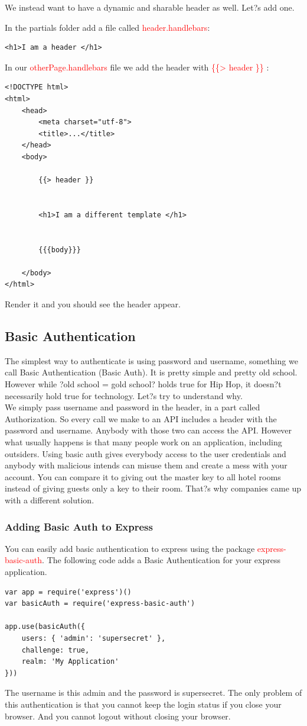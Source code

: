 \documentclass[a4paper]{article}
\begin{document}
We instead want to have a dynamic and sharable header as well. Let?s add one.

In the partials folder add a file called \textcolor{red}{header.handlebars}:
\begin{lstlisting}
<h1>I am a header </h1>
\end{lstlisting}
In our \textcolor{red}{otherPage.handlebars} file we add the header with \textcolor{red}{\{\{> header \}\}} :
\begin{lstlisting}
<!DOCTYPE html>
<html>
    <head>
        <meta charset="utf-8">
        <title>...</title>
    </head>
    <body>
        
        {{> header }}
        

        <h1>I am a different template </h1>

        
        {{{body}}}
        
    </body>
</html>
\end{lstlisting}
Render it and you should see the header appear.
\subsection{Basic Authentication}
The simplest way to authenticate is using password and username, something we call Basic Authentication (Basic Auth). It is pretty simple and pretty old school. However while ?old school = gold school? holds true for Hip Hop, it doesn?t necessarily hold true for technology. Let?s try to understand why.\\

We simply pass username and password in the header, in a part called Authorization. So every call we make to an API includes a header with the password and username. Anybody with those two can access the API. However what usually happens is that many people work on an application, including outsiders. Using basic auth gives everybody access to the user credentials and anybody with malicious intends can misuse them and create a mess with your account. You can compare it to giving out the master key to all hotel rooms instead of giving guests only a key to their room. That?s why companies came up with a different solution.\\
\subsubsection{Adding Basic Auth to Express}
You can easily add basic authentication to express using the package  \textcolor{red}{express-basic-auth}. The following code adds a Basic Authentication for your express application.
\begin{lstlisting}
var app = require('express')()
var basicAuth = require('express-basic-auth')
 
app.use(basicAuth({
    users: { 'admin': 'supersecret' },
    challenge: true,
    realm: 'My Application'
}))
\end{lstlisting}
The username is this admin and the password is supersecret. The only problem of this authentication is that you cannot keep the login status if you close your browser. And you cannot logout without closing your browser.
\end{document}
